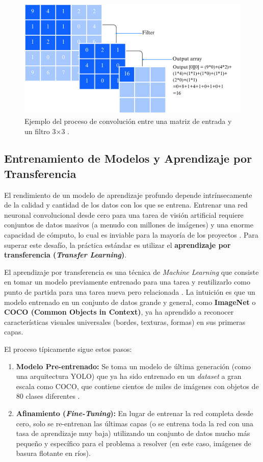 \begin{figure}[H]
    \centering
    \includegraphics[width=0.5\linewidth]{Documento/Imagenes/Marco Teorico/CNN.pdf}
    \caption{Ejemplo del proceso de convolución entre una matriz de entrada y un filtro 3×3 \cite{cnnIBM}.}
    \label{fig:cnn_convolution}
\end{figure}

\subsection{Entrenamiento de Modelos y Aprendizaje por Transferencia}
\label{subsec:transfer_learning}

El rendimiento de un modelo de aprendizaje profundo depende intrínsecamente de la calidad y cantidad de los datos con los que se entrena. Entrenar una red neuronal convolucional desde cero para una tarea de visión artificial requiere conjuntos de datos masivos (a menudo con millones de imágenes) y una enorme capacidad de cómputo, lo cual es inviable para la mayoría de los proyectos \cite{pan2009survey}. Para superar este desafío, la práctica estándar es utilizar el \textbf{aprendizaje por transferencia (\textit{Transfer Learning})}.

El aprendizaje por transferencia es una técnica de \textit{Machine Learning} que consiste en tomar un modelo previamente entrenado para una tarea y reutilizarlo como punto de partida para una tarea nueva pero relacionada \cite{bengio2012deep}. La intuición es que un modelo entrenado en un conjunto de datos grande y general, como \textbf{ImageNet} o \textbf{COCO (Common Objects in Context)}, ya ha aprendido a reconocer características visuales universales (bordes, texturas, formas) en sus primeras capas.

El proceso típicamente sigue estos pasos:
\begin{enumerate}
    \item \textbf{Modelo Pre-entrenado:} Se toma un modelo de última generación (como una arquitectura YOLO) que ya ha sido entrenado en un \textit{dataset} a gran escala como COCO, que contiene cientos de miles de imágenes con objetos de 80 clases diferentes \cite{lin2014microsoft}.
    \item \textbf{Afinamiento (\textit{Fine-Tuning}):} En lugar de entrenar la red completa desde cero, solo se re-entrenan las últimas capas (o se entrena toda la red con una tasa de aprendizaje muy baja) utilizando un conjunto de datos mucho más pequeño y específico para el problema a resolver (en este caso, imágenes de basura flotante en ríos).
\end{enumerate}

